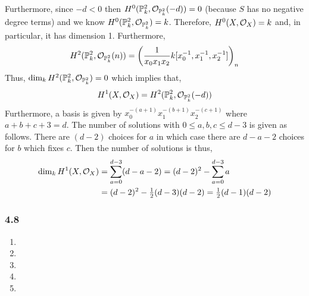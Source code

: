 \documentclass[12pt]{article}
\begin{document}
\begin{center}
\end{center}
Furthermore, since $-d < 0$ then $H^0(\mathbb{P}^2_k, \mathcal{O}_{\mathbb{P}^2_k}(-d)) = 0$ (because $S$ has no negative degree terms) and we know $H^0(\mathbb{P}^2_k, \mathcal{O}_{\mathbb{P}^2_k}) = k$. Therefore, $H^0(X, \mathcal{O}_{X}) = k$ and, in particular, it has dimension 1. Furthermore, 
\[ H^2(\mathbb{P}^2_k, \mathcal{O}_{\mathbb{P}^2_k}(n)) = \left( \frac{1}{x_0 x_1 x_2} k[x_0^{-1}, x_1^{-1}, x_2^{-1}] \right)_n \]
Thus, $\dim_k H^2(\mathbb{P}^2_k, \mathcal{O}_{\mathbb{P}^2_k}) = 0$ which implies that,
\[ H^1(X, \mathcal{O}_{X}) = H^2(\mathbb{P}^2_k, \mathcal{O}_{\mathbb{P}^2_k}(-d)) \]
Furthermore, a basis is given by $x_0^{-(a + 1)} x_1^{-(b + 1)} x_2^{-(c + 1)}$ where $a + b + c + 3 = d$. The number of solutions with $0 \le a,b,c \le d - 3$ is given as follows. There are $(d - 2)$ choices for $a$ in which case there are $d - a - 2$ choices for $b$ which fixes $c$. Then the number of solutions is thus,
\begin{align*}
\dim_k H^1(X, \mathcal{O}_{X}) & = \sum_{a = 0}^{d - 3} (d - a - 2) = (d - 2)^2 - \sum_{a = 0}^{d - 3} a 
\\
& = (d - 2)^2 - \tfrac{1}{2} (d - 3)(d - 2) = \tfrac{1}{2} (d - 1)(d - 2)
\end{align*}

\subsubsection{4.8}

\begin{enumerate}
\item

\item

\item

\item

\item
\end{enumerate}
\end{document}
